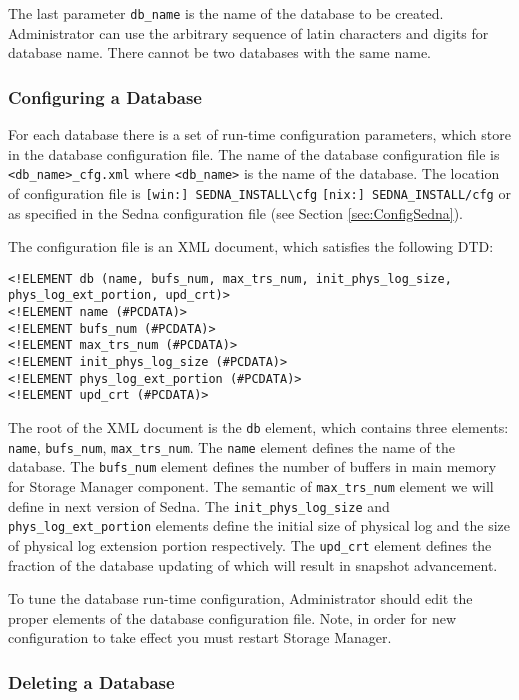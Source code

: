 \documentclass[a4paper,12pt]{article}
\begin{document}
The last parameter \verb!db_name! is the name of the database to be created. Administrator can use the arbitrary sequence of latin characters and digits for database name. There  cannot be two databases with the same name.

\subsubsection{Configuring a Database}
\label{ConfigDB}
For each database there is a set of run-time configuration parameters, which store in the database configuration file. The name of the database configuration file is \verb!<db_name>_cfg.xml! where \verb!<db_name>! is the name of the database. The location of configuration file is \verb![win:] SEDNA_INSTALL\cfg! \verb![nix:] SEDNA_INSTALL/cfg! or as specified in the Sedna configuration file (see Section \ref{sec:ConfigSedna}). 

The configuration file is an XML document, which satisfies the following DTD: 

\begin{verbatim}
<!ELEMENT db (name, bufs_num, max_trs_num, init_phys_log_size, phys_log_ext_portion, upd_crt)>
<!ELEMENT name (#PCDATA)>
<!ELEMENT bufs_num (#PCDATA)>
<!ELEMENT max_trs_num (#PCDATA)>
<!ELEMENT init_phys_log_size (#PCDATA)>
<!ELEMENT phys_log_ext_portion (#PCDATA)>
<!ELEMENT upd_crt (#PCDATA)>
\end{verbatim}

The root of the XML document is the \verb!db! element, which contains three elements: \verb!name!, \verb!bufs_num!, \verb!max_trs_num!. The \verb!name! element defines the name of the database. The \verb!bufs_num! element defines the number of buffers in main memory for Storage Manager component. The semantic of \verb!max_trs_num! element we will define in next version of Sedna. The \verb!init_phys_log_size! and \verb!phys_log_ext_portion! elements define the initial size of physical log and the size of physical log extension portion respectively. The \verb!upd_crt! element defines the fraction of the database updating of which will result in snapshot advancement.

To tune the database run-time configuration, Administrator should edit the proper elements of the database configuration file. Note, in order for new configuration to take effect you must restart Storage Manager.

\subsubsection{Deleting a Database}
\end{document}

